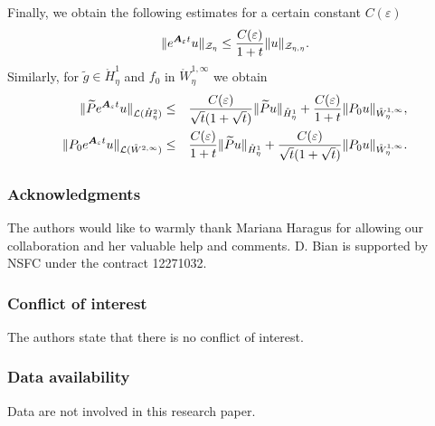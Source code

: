 \documentclass[11pt]{article}
\begin{document}
Finally, we obtain the following estimates for a certain constant $%
C(\varepsilon )$%
$$
\|e^{\boldsymbol{A}_{\varepsilon }t}u\|_{\mathcal{Z}_\eta}
\leq {C(\varepsilon) \over 1 + t} \| u \|_{\mathcal{Z}_{\eta,\eta}}.
$$
Similarly, for $\widetilde{g}\in \mathring{H}_{\eta}^{1}$ and $f_{0}$ in $%
\mathring{W}_{\eta}^{1,\infty }$ we obtain%
\begin{eqnarray*}
\|\widetilde{P}e^{\boldsymbol{A}_{\varepsilon }t}u\|_{\mathcal{L}(\mathring{H%
}_{\eta}^{2})} &\leq &\frac{C(\varepsilon )}{\sqrt{t} (1 + \sqrt{t})}\|\widetilde{P}u\|_{%
\mathring{H}_{\eta}^{1}}+\frac{C(\varepsilon )}{1+{t}}\|P_{0}u\|_{%
\mathring{W}_{\eta}^{1,\infty }}, \\
\|P_{0}e^{\boldsymbol{A}_{\varepsilon }t}u\|_{\mathcal{L}(\mathring{W}%
^{2,\infty })} &\leq &\frac{C(\varepsilon )}{1+{t}}\|\widetilde{P}u\|_{%
\mathring{H}_{\eta}^{1}}+\frac{C(\varepsilon )}{\sqrt{t}(1 + \sqrt{t})}\|P_{0}u\|_{\mathring{W%
}_{\eta}^{1,\infty }}.
\end{eqnarray*}







\subsubsection*{Acknowledgments}  

The authors would like to warmly thank Mariana Haragus
for allowing our collaboration and her valuable help
and comments.
D. Bian is supported by NSFC under the contract 12271032.



\subsubsection*{Conflict of interest}  The authors state that there is no conflict of interest.


\subsubsection*{Data availability}  Data are not involved in this research paper.


\end{document}

